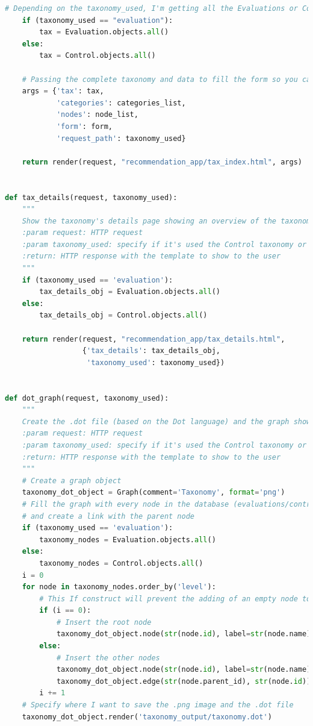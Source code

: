 \begin{lstlisting}[language=Python, caption={Parti principali del codice delle View della soluzione per gestire la navigazione 
    delle tassonomie, quella delle Evaluation e quella dei Controlli}]
    # Depending on the taxonomy_used, I'm getting all the Evaluations or Controls taxonomy
    if (taxonomy_used == "evaluation"):
        tax = Evaluation.objects.all()
    else:
        tax = Control.objects.all()

    # Passing the complete taxonomy and data to fill the form so you can operate on the taxonomy
    args = {'tax': tax,
            'categories': categories_list,
            'nodes': node_list,
            'form': form,
            'request_path': taxonomy_used}

    return render(request, "recommendation_app/tax_index.html", args)


def tax_details(request, taxonomy_used):
    """
    Show the taxonomy's details page showing an overview of the taxonomy
    :param request: HTTP request
    :param taxonomy_used: specify if it's used the Control taxonomy or the Evaluation taxonomy
    :return: HTTP response with the template to show to the user
    """
    if (taxonomy_used == 'evaluation'):
        tax_details_obj = Evaluation.objects.all()
    else:
        tax_details_obj = Control.objects.all()

    return render(request, "recommendation_app/tax_details.html",
                  {'tax_details': tax_details_obj,
                   'taxonomy_used': taxonomy_used})


def dot_graph(request, taxonomy_used):
    """
    Create the .dot file (based on the Dot language) and the graph showing the taxonomy in .png format
    :param request: HTTP request
    :param taxonomy_used: specify if it's used the Control taxonomy or the Evaluation taxonomy
    :return: HTTP response with the template to show to the user
    """
    # Create a graph object
    taxonomy_dot_object = Graph(comment='Taxonomy', format='png')
    # Fill the graph with every node in the database (evaluations/controls node and categories nodes), 
    # and create a link with the parent node
    if (taxonomy_used == 'evaluation'):
        taxonomy_nodes = Evaluation.objects.all()
    else:
        taxonomy_nodes = Control.objects.all()
    i = 0
    for node in taxonomy_nodes.order_by('level'):
        # This If construct will prevent the adding of an empty node to the root node in the graph
        if (i == 0):
            # Insert the root node
            taxonomy_dot_object.node(str(node.id), label=str(node.name))
        else:
            # Insert the other nodes
            taxonomy_dot_object.node(str(node.id), label=str(node.name))
            taxonomy_dot_object.edge(str(node.parent_id), str(node.id))
        i += 1
    # Specify where I want to save the .png image and the .dot file
    taxonomy_dot_object.render('taxonomy_output/taxonomy.dot')


\end{lstlisting}
